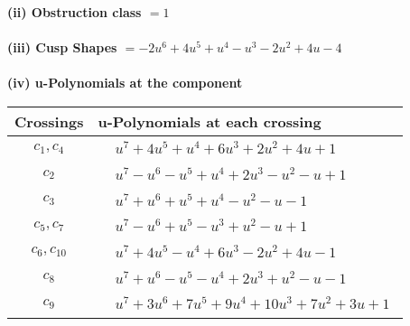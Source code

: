 \documentclass[1p]{elsarticle_modified}
\theoremstyle{definition}
\begin{document}
\flushleft \textbf{(ii) Obstruction class $= 1$}\\~\\
\flushleft \textbf{(iii) Cusp Shapes $= -2 u^6+4 u^5+u^4- u^3-2 u^2+4 u-4$}\\~\\
\newpage\renewcommand{\arraystretch}{1}
\flushleft \textbf{(iv) u-Polynomials at the component}\newline \\
\begin{tabular}{m{50pt}|m{274pt}}
Crossings & \hspace{64pt}u-Polynomials at each crossing \\
\hline $$\begin{aligned}c_{1},c_{4}\end{aligned}$$&$\begin{aligned}
&u^7+4 u^5+u^4+6 u^3+2 u^2+4 u+1
\end{aligned}$\\
\hline $$\begin{aligned}c_{2}\end{aligned}$$&$\begin{aligned}
&u^7- u^6- u^5+u^4+2 u^3- u^2- u+1
\end{aligned}$\\
\hline $$\begin{aligned}c_{3}\end{aligned}$$&$\begin{aligned}
&u^7+u^6+u^5+u^4- u^2- u-1
\end{aligned}$\\
\hline $$\begin{aligned}c_{5},c_{7}\end{aligned}$$&$\begin{aligned}
&u^7- u^6+u^5- u^3+u^2- u+1
\end{aligned}$\\
\hline $$\begin{aligned}c_{6},c_{10}\end{aligned}$$&$\begin{aligned}
&u^7+4 u^5- u^4+6 u^3-2 u^2+4 u-1
\end{aligned}$\\
\hline $$\begin{aligned}c_{8}\end{aligned}$$&$\begin{aligned}
&u^7+u^6- u^5- u^4+2 u^3+u^2- u-1
\end{aligned}$\\
\hline $$\begin{aligned}c_{9}\end{aligned}$$&$\begin{aligned}
&u^7+3 u^6+7 u^5+9 u^4+10 u^3+7 u^2+3 u+1
\end{aligned}$\\
\hline
\end{tabular}\\~\\
\end{document}
